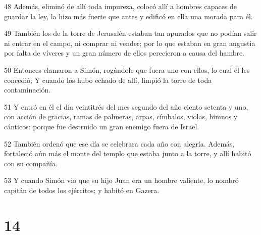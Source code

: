 \par 48 Además, eliminó de allí toda impureza, colocó allí a hombres capaces de guardar la ley, la hizo más fuerte que antes y edificó en ella una morada para él.
\par 49 También los de la torre de Jerusalén estaban tan apurados que no podían salir ni entrar en el campo, ni comprar ni vender; por lo que estaban en gran angustia por falta de víveres y un gran número de ellos perecieron a causa del hambre.
\par 50 Entonces clamaron a Simón, rogándole que fuera uno con ellos, lo cual él les concedió; Y cuando los hubo echado de allí, limpió la torre de toda contaminación.
\par 51 Y entró en él el día veintitrés del mes segundo del año ciento setenta y uno, con acción de gracias, ramas de palmeras, arpas, címbalos, violas, himnos y cánticos: porque fue destruido un gran enemigo fuera de Israel.
\par 52 También ordenó que ese día se celebrara cada año con alegría. Además, fortaleció aún más el monte del templo que estaba junto a la torre, y allí habitó con su compañía.
\par 53 Y cuando Simón vio que su hijo Juan era un hombre valiente, lo nombró capitán de todos los ejércitos; y habitó en Gazera.

\chapter{14}

